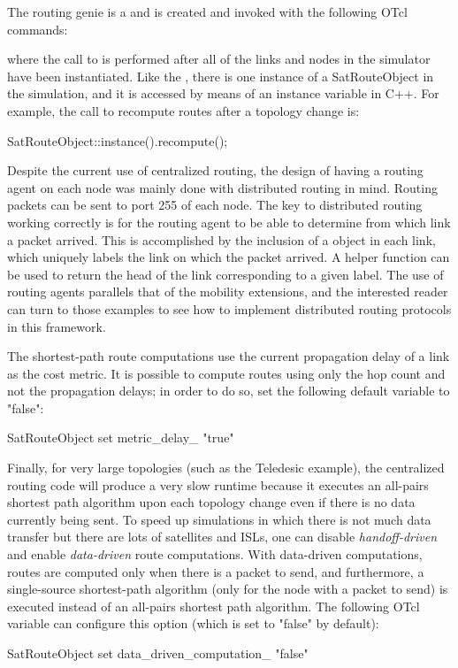 The routing genie is a  and is created and
invoked with the following OTcl commands:
where the call to  is performed after all of the
links and nodes in the simulator have been instantiated.
Like the , there is one instance of a SatRouteObject in the
simulation, and it is accessed by means of an instance variable in C++.
For example, the call to recompute routes after a topology change is:
\begin{program}
SatRouteObject::instance().recompute();
\end{program}

Despite the current use of centralized routing, the design of having
a routing agent on each node was mainly done with distributed routing 
in mind.  Routing packets can be sent to port 255 of each node.  The key
to distributed routing working correctly is for the routing agent to
be able to 
determine from which link a packet arrived.  This is accomplished by the
inclusion of a  object in each link, which
uniquely labels the link on which the packet arrived.  A helper function
 can be used to return the head 
of the
link corresponding to a given label.  The use of routing agents parallels
that of the mobility extensions, and the interested reader can turn to
those examples to see how to implement distributed routing protocols in
this framework.

The shortest-path route computations use the current propagation delay of
a link as the cost metric.  It is possible to compute routes using only
the hop count and not the propagation delays; in order to do so, set
the following default variable to "false":
\begin{program}
SatRouteObject set metric_delay_ "true"
\end{program}

Finally, for very large topologies (such as the Teledesic example), the 
centralized routing code will produce a very slow runtime because it executes
an all-pairs shortest path algorithm upon each topology change even if
there is no data currently being sent.  To speed up simulations in which
there is not much data transfer but there are lots of satellites and
ISLs, one can disable {\em handoff-driven} and enable {\em data-driven} 
route computations.  With data-driven computations, routes are computed
only when there is a packet to send, and furthermore, a single-source
shortest-path algorithm (only for the node with a packet to send) is 
executed instead of an all-pairs shortest path algorithm.  The following
OTcl variable can configure this option (which is set to "false" by
default):
\begin{program}
SatRouteObject set data_driven_computation_ "false"
\end{program}


